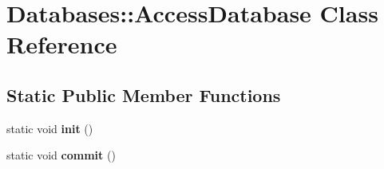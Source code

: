 \hypertarget{classDatabases_1_1AccessDatabase}{\section{Databases\-:\-:Access\-Database Class Reference}
\label{classDatabases_1_1AccessDatabase}
}
\subsection*{Static Public Member Functions}
\begin{DoxyCompactItemize}
\item 
\hypertarget{classDatabases_1_1AccessDatabase_a5a3df6b81283bbb9f25bf7a531f470ff}{static void {\bfseries init} ()}\label{classDatabases_1_1AccessDatabase_a5a3df6b81283bbb9f25bf7a531f470ff}

\item 
\hypertarget{classDatabases_1_1AccessDatabase_ac1a811b4c3d017665c95cc23740d90f9}{static void {\bfseries commit} ()}\label{classDatabases_1_1AccessDatabase_ac1a811b4c3d017665c95cc23740d90f9}

\end{DoxyCompactItemize}
